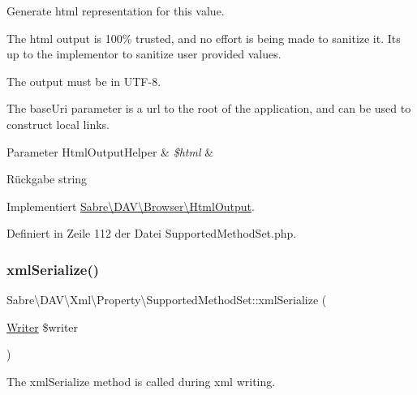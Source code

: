 Generate html representation for this value.

The html output is 100\% trusted, and no effort is being made to sanitize it. It\textquotesingle{}s up to the implementor to sanitize user provided values.

The output must be in U\+T\+F-\/8.

The base\+Uri parameter is a url to the root of the application, and can be used to construct local links.


\begin{DoxyParams}[1]{Parameter}
Html\+Output\+Helper & {\em \$html} & \\
\hline
\end{DoxyParams}
\begin{DoxyReturn}{Rückgabe}
string 
\end{DoxyReturn}


Implementiert \mbox{\hyperlink{interface_sabre_1_1_d_a_v_1_1_browser_1_1_html_output_a53a24f82474cef8c1fcf00e87de3bf7c}{Sabre\textbackslash{}\+D\+A\+V\textbackslash{}\+Browser\textbackslash{}\+Html\+Output}}.



Definiert in Zeile 112 der Datei Supported\+Method\+Set.\+php.

\mbox{\label{class_sabre_1_1_d_a_v_1_1_xml_1_1_property_1_1_supported_method_set_afcdb94acaf6d8fead3559dd9d181dd83}} 
\subsubsection{\texorpdfstring{xml\+Serialize()}{xmlSerialize()}}
{\footnotesize\ttfamily Sabre\textbackslash{}\+D\+A\+V\textbackslash{}\+Xml\textbackslash{}\+Property\textbackslash{}\+Supported\+Method\+Set\+::xml\+Serialize (\begin{DoxyParamCaption}\item[{\mbox{\hyperlink{class_sabre_1_1_xml_1_1_writer}{Writer}}}]{\$writer }\end{DoxyParamCaption})}

The xml\+Serialize method is called during xml writing.

